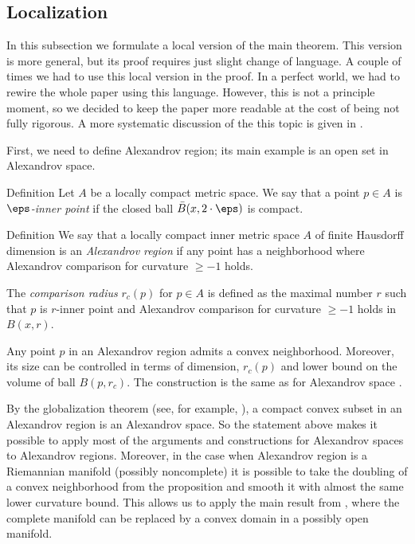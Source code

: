 \subsection{Localization}\label{sec:local}

In this subsection we formulate a local version of the main theorem.
This version is more general, but its proof requires just slight change of language.
A couple of times we had to use this local version in the proof.
In a perfect world, we had to rewire the whole paper using this language.
However, this is not a principle moment,
so we decided to keep the paper more readable at the cost of being not fully rigorous.
A more systematic discussion of the this topic is given in \cite{LNep}.

First, we need to define Alexandrov region;
its main example is an open set in Alexandrov space.

\begin{thm}{Definition}
Let $A$ be a locally compact metric space. 
We say that a point  $p\in A$
is  \emph{ $\eps$-inner point} if
the closed ball $\bar B(x,2\cdot\eps)$ is compact.
\end{thm}

\begin{thm}{Definition}
We say that a locally compact inner metric space $A$ of finite Hausdorff dimension
is an \emph{Alexandrov region} if
any point has a neighborhood where Alexandrov
comparison for curvature $\ge -1$ holds.

The \emph{comparison radius} $r_c(p)$ for $p\in A$ is defined as 
the maximal number $r$ such that
$p$ is $r$-inner point and Alexandrov
comparison for curvature $\ge -1$ holds in
$B(x,r)$.
\end{thm}

Any point $p$ in an Alexandrov region admits a convex neighborhood.
Moreover, its size can be controlled in terms of dimension, $r_c(p)$ and lower bound on the volume of ball $B(p,r_c)$.
The construction is the same as for Alexandrov space \cite[4.3]{perelman-petrunin}.

By the globalization theorem (see, for example, \cite{AKP}), a compact convex subset in an Alexandrov region is an Alexandrov space.
So the statement above makes it possible to apply most of the arguments and constructions for Alexandrov spaces to Alexandrov regions. 
Moreover, in the case when Alexandrov region is a Riemannian manifold (possibly noncomplete) it is possible to take the doubling of a convex neighborhood from the proposition
and smooth it with almost the same lower curvature bound.
This allows us to apply the main result from \cite{petrunin-SC}, where the complete manifold can be replaced by a convex domain in a possibly open manifold. 

